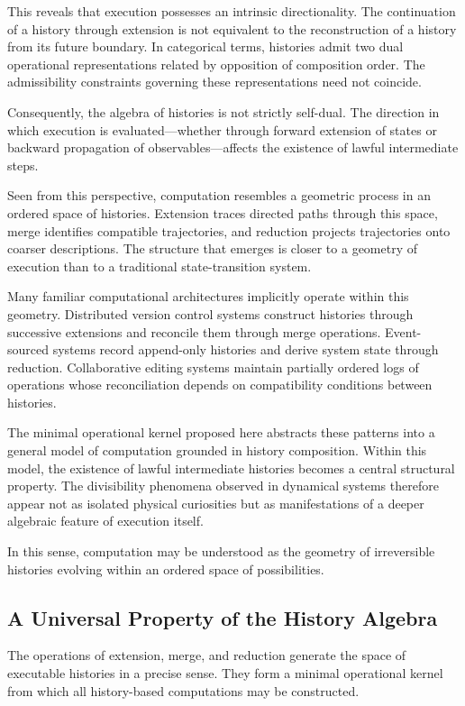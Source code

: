 \documentclass[12pt]{article}
\begin{document}
This reveals that execution possesses an intrinsic directionality. The
continuation of a history through extension is not equivalent to the
reconstruction of a history from its future boundary. In categorical
terms, histories admit two dual operational representations related by
opposition of composition order. The admissibility constraints governing
these representations need not coincide.

Consequently, the algebra of histories is not strictly self-dual. The
direction in which execution is evaluated—whether through forward
extension of states or backward propagation of observables—affects the
existence of lawful intermediate steps.

Seen from this perspective, computation resembles a geometric process
in an ordered space of histories. Extension traces directed paths
through this space, merge identifies compatible trajectories, and
reduction projects trajectories onto coarser descriptions. The
structure that emerges is closer to a geometry of execution than to a
traditional state-transition system.

Many familiar computational architectures implicitly operate within
this geometry. Distributed version control systems construct histories
through successive extensions and reconcile them through merge
operations. Event-sourced systems record append-only histories and
derive system state through reduction. Collaborative editing systems
maintain partially ordered logs of operations whose reconciliation
depends on compatibility conditions between histories.

The minimal operational kernel proposed here abstracts these patterns
into a general model of computation grounded in history composition.
Within this model, the existence of lawful intermediate histories
becomes a central structural property. The divisibility phenomena
observed in dynamical systems therefore appear not as isolated
physical curiosities but as manifestations of a deeper algebraic
feature of execution itself.

In this sense, computation may be understood as the geometry of
irreversible histories evolving within an ordered space of
possibilities.

\subsection{A Universal Property of the History Algebra}

The operations of extension, merge, and reduction generate the space of
executable histories in a precise sense. They form a minimal operational
kernel from which all history-based computations may be constructed.
\end{document}
